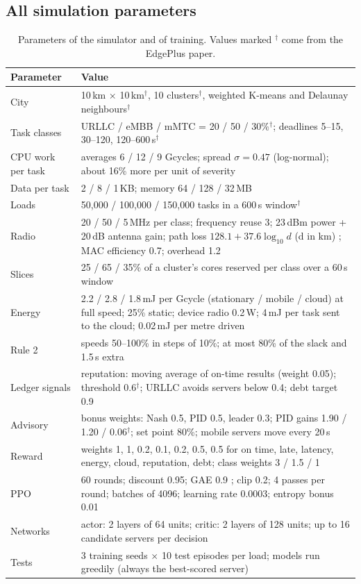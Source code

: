 \documentclass[11pt]{article}
\newcommand{\botrule}{\bottomrule}
\theoremstyle{definition}
\begin{document}
\begin{appendices}

\section{All simulation parameters}
\label{app:params}

\begin{table}[H]
\caption{Parameters of the simulator and of training. Values marked $^\dagger$ come from the EdgePlus paper.}
\small
\begin{tabularx}{\textwidth}{lL}
\toprule
Parameter & Value\\
\midrule
City & 10\,km $\times$ 10\,km$^\dagger$, 10 clusters$^\dagger$, weighted K-means and Delaunay neighbours$^\dagger$\\
Task classes & URLLC / eMBB / mMTC = 20 / 50 / 30\%$^\dagger$; deadlines 5--15, 30--120, 120--600\,s$^\dagger$\\
CPU work per task & averages 6 / 12 / 9 Gcycles; spread $\sigma=0.47$ (log-normal); about 16\% more per unit of severity\\
Data per task & 2 / 8 / 1\,KB; memory 64 / 128 / 32\,MB\\
Loads & 50{,}000 / 100{,}000 / 150{,}000 tasks in a 600\,s window$^\dagger$\\
Radio & 20 / 50 / 5\,MHz per class; frequency reuse 3; 23\,dBm power + 20\,dB antenna gain; path loss
$128.1 + 37.6\log_{10} d$ (d in km) \cite{3gpp36814}; MAC efficiency 0.7; overhead 1.2\\
Slices & 25 / 65 / 35\% of a cluster's cores reserved per class over a 60\,s window\\
Energy & 2.2 / 2.8 / 1.8\,mJ per Gcycle (stationary / mobile / cloud) at full speed; 25\% static; device radio 0.2\,W;
4\,mJ per task sent to the cloud; 0.02\,mJ per metre driven\\
Rule 2 & speeds 50--100\% in steps of 10\%; at most 80\% of the slack and 1.5\,s extra\\
Ledger signals & reputation: moving average of on-time results (weight 0.05); threshold 0.6$^\dagger$; URLLC avoids
servers below 0.4; debt target 0.9\\
Advisory & bonus weights: Nash 0.5, PID 0.5, leader 0.3; PID gains 1.90 / 1.20 / 0.06$^\dagger$; set point 80\%;
mobile servers move every 20\,s\\
Reward & weights 1, 1, 0.2, 0.1, 0.2, 0.5, 0.5 for on time, late, latency, energy, cloud, reputation, debt; class
weights 3 / 1.5 / 1\\
PPO & 60 rounds; discount 0.95; GAE 0.9 \cite{schulman2016gae}; clip 0.2; 4 passes per round; batches of 4096;
learning rate 0.0003; entropy bonus 0.01\\
Networks & actor: 2 layers of 64 units; critic: 2 layers of 128 units; up to 16 candidate servers per decision\\
Tests & 3 training seeds $\times$ 10 test episodes per load; models run greedily (always the best-scored server)\\
\botrule
\end{tabularx}
\end{table}

\end{appendices}



\end{document}
